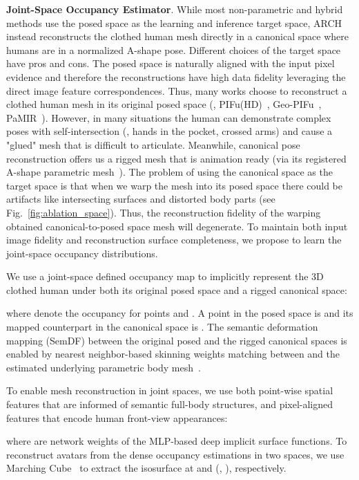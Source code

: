 \documentclass[10pt,twocolumn,letterpaper]{article}
\begin{document}
\textbf{Joint-Space Occupancy Estimator}. While most non-parametric and hybrid methods use the posed space as the learning and inference target space, ARCH instead reconstructs the clothed human mesh directly in a canonical space where humans are in a normalized A-shape pose. Different choices of the target space have pros and cons.
The posed space is naturally aligned with the input pixel evidence and therefore the reconstructions have high data fidelity leveraging the direct image feature correspondences. Thus, many works choose to reconstruct a clothed human mesh in its original posed space (\eg, PIFu(HD)~\cite{PIFuICCV19,saito2020pifuhd}, Geo-PIFu~\cite{he2020geopifu}, PaMIR~\cite{Zerong2020PaMIR}). However, in many situations the human can demonstrate complex poses with self-intersection (\eg, hands in the pocket, crossed arms) and cause a "glued" mesh that is difficult to articulate. Meanwhile, canonical pose reconstruction offers us a rigged mesh that is animation ready 
(via its registered A-shape parametric mesh~\cite{huang2020arch}).
The problem of using the canonical space as the target space is that when we warp the mesh into its posed space there could be artifacts like intersecting surfaces and distorted body parts (see Fig.~\ref{fig:ablation_space}). Thus, the reconstruction fidelity of the warping obtained canonical-to-posed space mesh will degenerate. To maintain both input image fidelity and reconstruction surface completeness, we propose to learn the joint-space occupancy distributions.

We use a joint-space defined occupancy map  to implicitly represent the 3D clothed human under both its original posed space and a rigged canonical space:

where  denote the occupancy for points  and . A point in the posed space is  and its mapped counterpart in the canonical space is . The semantic deformation mapping (SemDF) between the original posed and the rigged canonical spaces is enabled by nearest neighbor-based skinning weights matching between  and the estimated underlying parametric body mesh~\cite{huang2020arch}.

To enable mesh reconstruction in joint spaces, we use both point-wise spatial features  that are informed of semantic full-body structures, and pixel-aligned features  that encode human front-view appearances:

where  are network weights of the MLP-based deep implicit surface functions.
To reconstruct avatars from the dense occupancy estimations in two spaces, we use Marching Cube~\cite{MarchCube87} to extract the isosurface
at  and  (\ie, ), respectively.
\end{document}
